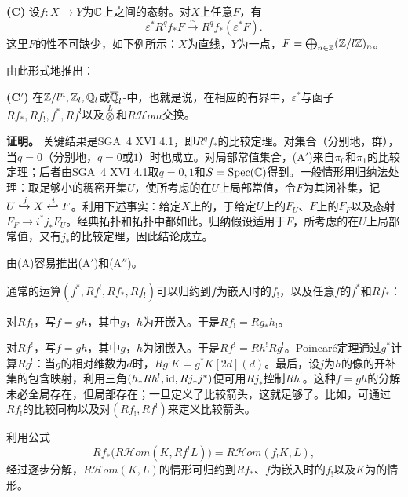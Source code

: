 \noindent\textbf{(C)} 设$f:X\to Y$为$\mathbb C$上之间的态射。对$X$上任意$F$，有
\[
\varepsilon^*R^qf_*F\xrightarrow{\sim}R^qf_*(\varepsilon^*F).
\]
这里$F$的性不可缺少，如下例所示：$X$为直线，$Y$为一点，$F=\bigoplus_{n\in\mathbb Z}(\mathbb Z/l\mathbb Z)_n$。

由此形式地推出：

\noindent\textbf{(C$'$)} 在$\mathbb Z/l^n,\mathbb Z_l,\mathbb Q_l$或$\overline{\mathbb Q}_l$-中，也就是说，在相应的有界中，$\varepsilon^*$与函子$Rf_*,Rf_!,f^*,Rf^!$以及$\overset L\otimes$和$R\mathcal Hom$交换。

\par\medskip\noindent\textbf{证明。} 关键结果是SGA~4 XVI 4.1，即$R^qf_*$的比较定理。对集合（分别地，群），当$q=0$（分别地，$q=0$或$1$）时也成立。对局部常值集合，(A$'$)来自$\pi_0$和$\pi_1$的比较定理；后者由SGA~4 XVI 4.1取$q=0,1$和$S=\operatorname{Spec}(\mathbb C)$得到。一般情形用归纳法处理：取足够小的稠密开集$U$，使所考虑的在$U$上局部常值，令$F$为其闭补集，记$U\xhookrightarrow{j}X\xhookleftarrow{i}F$。利用下述事实：给定$X$上的，于给定$U$上的$F_U$、$F$上的$F_F$以及态射$F_F\to i^*j_*F_U$。经典拓扑和拓扑中都如此。归纳假设适用于$F$，所考虑的在$U$上局部常值，又有$j_*$的比较定理，因此结论成立。

由(A)容易推出(A$'$)和(A$''$)。

通常的运算$(f^*,Rf^!,Rf_*,Rf_!)$可以归约到$f$为嵌入时的$f_!$，以及任意$f$的$f^*$和$Rf_*$：

对$Rf_!$，写$f=gh$，其中$g$，$h$为开嵌入。于是$Rf_!=Rg_*h_!$。

对$Rf^!$，写$f=gh$，其中$g$，$h$为闭嵌入。于是$Rf^!=Rh^!Rg^!$。Poincaré定理通过$g^*$计算$Rg^!$：当$g$的相对维数为$d$时，$Rg^!K=g^*K[2d](d)$。最后，设$j$为$h$的像的开补集的包含映射，利用三角$(h_*Rh^!,\allowbreak\operatorname{id},\allowbreak Rj_*j^*)$便可用$Rj_*$控制$Rh^!$。这种$f=gh$的分解未必全局存在，但局部存在；一旦定义了比较箭头，这就足够了。比如，可通过$Rf_!$的比较同构以及对$(Rf_!,Rf^!)$来定义比较箭头。

利用公式
\[
Rf_*\bigl(R\mathcal Hom(K,Rf^!L)\bigr)
 =R\mathcal Hom(f_!K,L),
\]
经过逐步分解，$R\mathcal Hom(K,L)$的情形可归约到$Rf_*$、$f$为嵌入时的$f_!$以及$K$为的情形。

